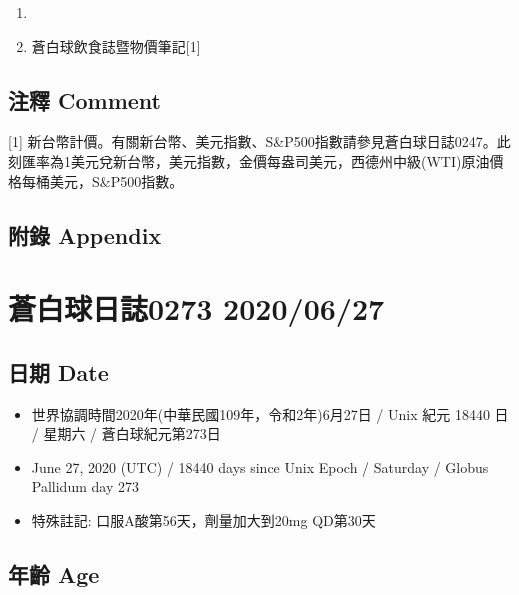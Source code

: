\documentclass[a5paper, 11pt
]{book}
\providecommand{\tightlist}{%
  \setlength{\itemsep}{0pt}\setlength{\parskip}{0pt}}
\begin{document}
\begin{enumerate}
\def\labelenumi{\arabic{enumi}.}
\tightlist
\item
\item
  蒼白球飲食誌暨物價筆記{[}1{]}
\end{enumerate}

\hypertarget{ux6ce8ux91cb-comment-25}{%
\subsection{注釋 Comment}\label{ux6ce8ux91cb-comment-25}}

{[}1{]}
新台幣計價。有關新台幣、美元指數、S\&P500指數請參見蒼白球日誌0247。此刻匯率為1美元兌新台幣，美元指數，金價每盎司美元，西德州中級(WTI)原油價格每桶美元，S\&P500指數。

\hypertarget{ux9644ux9304-appendix-25}{%
\subsection{附錄 Appendix}\label{ux9644ux9304-appendix-25}}

\hypertarget{ux84bcux767dux7403ux65e5ux8a8c0273-20200627}{%
\section{蒼白球日誌0273
2020/06/27}\label{ux84bcux767dux7403ux65e5ux8a8c0273-20200627}}

\hypertarget{ux65e5ux671f-date-26}{%
\subsection{日期 Date}\label{ux65e5ux671f-date-26}}

\begin{itemize}
\tightlist
\item
  世界協調時間2020年(中華民國109年，令和2年)6月27日 / Unix 紀元 18440 日
  / 星期六 / 蒼白球紀元第273日
\item
  June 27, 2020 (UTC) / 18440 days since Unix Epoch / Saturday / Globus
  Pallidum day 273
\item
  特殊註記: 口服A酸第56天，劑量加大到20mg QD第30天
\end{itemize}

\hypertarget{ux5e74ux9f61-age-26}{%
\subsection{年齡 Age}\label{ux5e74ux9f61-age-26}}
\end{document}
